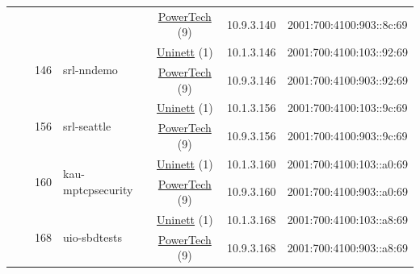 \begin{small}
\begin{center}
\begin{longtable}{|c|c|c|c|c|c|c|c|}
  &  &  &  & \multicolumn{2}{|c|}{\tiny{\href{http://www.powertech.no}{PowerTech} (9)}} & \tiny{10.9.3.140} & \tiny{2001:700:4100:903::8c:69} \\* \cline{3-3}\cline{4-4}\cline{5-5}\cline{6-6}\cline{7-7}\cline{8-8}
  &  & \multirow{2}{*}{\tiny{146}} & \multicolumn{1}{|l|}{\multirow{2}{*}{\tiny{srl-nndemo}}} & \multicolumn{2}{|c|}{\tiny{\href{https://www.uninett.no}{Uninett} (1)}} & \tiny{10.1.3.146} & \tiny{2001:700:4100:103::92:69} \\* \cline{5-5}\cline{6-6}\cline{7-7}\cline{8-8}
  &  &  &  & \multicolumn{2}{|c|}{\tiny{\href{http://www.powertech.no}{PowerTech} (9)}} & \tiny{10.9.3.146} & \tiny{2001:700:4100:903::92:69} \\* \cline{3-3}\cline{4-4}\cline{5-5}\cline{6-6}\cline{7-7}\cline{8-8}
  &  & \multirow{2}{*}{\tiny{156}} & \multicolumn{1}{|l|}{\multirow{2}{*}{\tiny{srl-seattle}}} & \multicolumn{2}{|c|}{\tiny{\href{https://www.uninett.no}{Uninett} (1)}} & \tiny{10.1.3.156} & \tiny{2001:700:4100:103::9c:69} \\* \cline{5-5}\cline{6-6}\cline{7-7}\cline{8-8}
  &  &  &  & \multicolumn{2}{|c|}{\tiny{\href{http://www.powertech.no}{PowerTech} (9)}} & \tiny{10.9.3.156} & \tiny{2001:700:4100:903::9c:69} \\* \cline{3-3}\cline{4-4}\cline{5-5}\cline{6-6}\cline{7-7}\cline{8-8}
  &  & \multirow{2}{*}{\tiny{160}} & \multicolumn{1}{|l|}{\multirow{2}{*}{\tiny{kau-mptcpsecurity}}} & \multicolumn{2}{|c|}{\tiny{\href{https://www.uninett.no}{Uninett} (1)}} & \tiny{10.1.3.160} & \tiny{2001:700:4100:103::a0:69} \\* \cline{5-5}\cline{6-6}\cline{7-7}\cline{8-8}
  &  &  &  & \multicolumn{2}{|c|}{\tiny{\href{http://www.powertech.no}{PowerTech} (9)}} & \tiny{10.9.3.160} & \tiny{2001:700:4100:903::a0:69} \\* \cline{3-3}\cline{4-4}\cline{5-5}\cline{6-6}\cline{7-7}\cline{8-8}
  &  & \multirow{2}{*}{\tiny{168}} & \multicolumn{1}{|l|}{\multirow{2}{*}{\tiny{uio-sbdtests}}} & \multicolumn{2}{|c|}{\tiny{\href{https://www.uninett.no}{Uninett} (1)}} & \tiny{10.1.3.168} & \tiny{2001:700:4100:103::a8:69} \\* \cline{5-5}\cline{6-6}\cline{7-7}\cline{8-8}
  &  &  &  & \multicolumn{2}{|c|}{\tiny{\href{http://www.powertech.no}{PowerTech} (9)}} & \tiny{10.9.3.168} & \tiny{2001:700:4100:903::a8:69} \\ \hline
\end{longtable}
\end{center}
\end{small}



